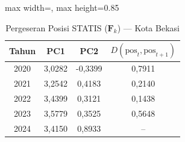\begin{table}[H]
\centering
\caption{Pergeseran Posisi STATIS ($\mathbf{F}_k$) --- Kota Bekasi} \label{tab:app1jarak_statis_skor_kota_bekasi}
\begin{adjustbox}{max width=\textwidth, max height=0.85\textheight}
\begin{tabular}{|c|c|c|c|}
\hline
\textbf{Tahun} & \textbf{PC1} & \textbf{PC2} & \textbf{$D(\text{pos}_t, \text{pos}_{t+1})$} \\
\hline
2020 & 3,0282 & -0,3399 & 0,7911 \\
2021 & 3,2542 & 0,4183 & 0,2140 \\
2022 & 3,4399 & 0,3121 & 0,1438 \\
2023 & 3,5779 & 0,3525 & 0,5648 \\
2024 & 3,4150 & 0,8933 & -- \\
\hline
\end{tabular}
\end{adjustbox}
\end{table}